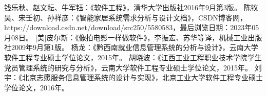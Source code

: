 

\begin{thebibliography}{99}  

钱乐秋、赵文耘、牛军钰：《软件工程》，清华大学出版社2016年9月第3版。
陈牧昊、宋壬初、孙祥彦：《智能家居系统需求分析与设计文档》，CSDN博客网，https://download.csdn.net/download/src250/5580583，最后浏览日期：2023年05月08日。
[美]皮尔斯：《像拍电影一样做软件》，李振宏、苏华等译，机械工业出版社2009年9月第1版。
杨龙：《黔西南就业信息管理系统的分析与设计》，云南大学软件工程专业硕士学位论文，2015年。
胡晓波：《江西工业工程职业技术学院学生党员管理系统的研究与分析》，云南大学软件工程专业硕士学位论文，2015年。
刘宇：《北京志愿服务信息管理系统的设计与实现》，北京工业大学软件工程专业硕士学位论文，2016年。

\end{thebibliography}


\newpage